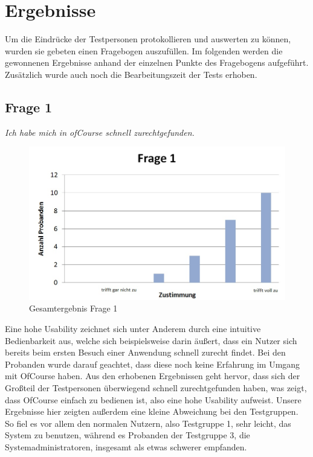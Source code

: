 \section{Ergebnisse}
Um die Eindrücke der Testpersonen protokollieren und auswerten zu können, wurden sie gebeten einen Fragebogen auszufüllen.
Im folgenden werden die gewonnenen Ergebnisse anhand der einzelnen Punkte des Fragebogens aufgeführt. Zusätzlich
wurde auch noch die Bearbeitungszeit der Tests erhoben.

\subsection{Frage 1}
\begin{center}
	{\it Ich habe mich in ofCourse schnell zurechtgefunden.}
\end{center}
\begin{figure}[h]
\centering
\includegraphics[width=0.7\linewidth]{img/Frage1}
\caption{Gesamtergebnis Frage 1}
\label{fig:Frage1}
\end{figure}
Eine hohe Usability zeichnet sich unter Anderem durch eine intuitive Bedienbarkeit aus, welche sich beispielsweise darin äußert, dass ein Nutzer sich bereits beim ersten Besuch einer Anwendung schnell zurecht findet. Bei den Probanden wurde darauf geachtet, dass diese noch keine Erfahrung im Umgang mit OfCourse haben. Aus den erhobenen Ergebnissen geht hervor, dass sich der Großteil der Testpersonen überwiegend schnell zurechtgefunden haben, was zeigt, dass OfCourse einfach zu bedienen ist, also eine hohe Usability aufweist. Unsere Ergebnisse hier zeigten außerdem eine kleine Abweichung bei den Testgruppen. So fiel es vor allem den normalen Nutzern, also Testgruppe 1, sehr leicht, das System zu benutzen, während es Probanden der Testgruppe 3, die Systemadministratoren, insgesamt als etwas schwerer empfanden.

